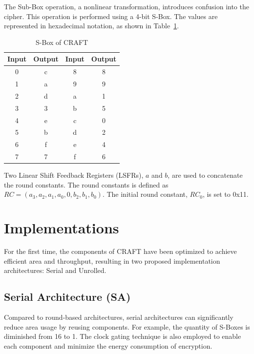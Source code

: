 \documentclass[final,5p,times,twocolumn]{elsarticle}
\begin{document}
The Sub-Box operation, a nonlinear transformation, introduces confusion into the cipher.
This operation is performed using a 4-bit S-Box. The values are represented in hexadecimal notation, as shown in Table~\ref{tab4}.

\begin{table}[h]
    \centering
    \caption{S-Box of CRAFT}\label{tab4}%
    \begin{tabular}{|c|c|c|c|}
        \hline
        Input & Output & Input & Output \\
        \hline
        0     & c      & 8     & 8      \\
        1     & a      & 9     & 9      \\
        2     & d      & a     & 1      \\
        3     & 3      & b     & 5      \\
        4     & e      & c     & 0      \\
        5     & b      & d     & 2      \\
        6     & f      & e     & 4      \\
        7     & 7      & f     & 6      \\
        \hline
    \end{tabular}
\end{table}

Two Linear Shift Feedback Registers (LSFRs), $a$ and $b$, are used to concatenate the round constants.
The round constants is defined as $RC=(a_3,a_2,a_1,a_0,0,b_2,b_1,b_0)$. The initial round constant, $RC_0$, is set to 0x11.

\section{Implementations}\label{sec3}

For the first time, the components of CRAFT have been optimized to achieve efficient area and throughput, resulting in two proposed implementation architectures: Serial and Unrolled.


\subsection{Serial Architecture (SA)}\label{subsec2}
Compared to round-based architectures, serial architectures can significantly reduce area usage by reusing components.
For example, the quantity of S-Boxes is diminished from 16 to 1.
The clock gating technique is also employed to enable each component and minimize the energy consumption of encryption.
\end{document}
